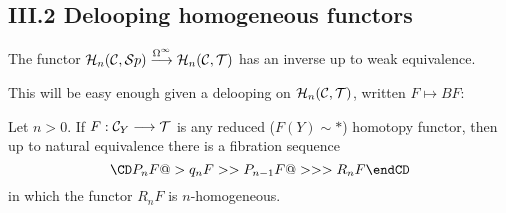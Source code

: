 \documentclass[11pt]{article}
\begin{document}
\begin{Calculus III}
\subsection*{III.2 Delooping homogeneous functors}
\begin{thm*}[\textbf{2.1}]
The functor
$
\mathcal{H}_n(\mathcal{C},\mathcal{S} p)\overset{\Omega^\infty}{\longrightarrow}\mathcal{H}_n(\mathcal{C},\mathcal{T})
$
has an inverse up to weak equivalence.
\end{thm*}
This will be easy enough given a delooping on $\mathcal{H}_n(\mathcal{C},\mathcal{T})$, written $F\mapsto BF$:
\begin{lem*}[\textbf{2.2}]
Let $n>0$. If $F:\mathcal{C}_Y\longrightarrow\mathcal{T}$ is
any reduced ($F(Y)\sim *$) homotopy functor, then up to natural equivalence
there is a fibration sequence
$$\CD
                            P_nF @>{q_nF}>> P_{n-1}F @>>> R_nF
\endCD
$$
in which the functor $R_nF$ is $n$-homogeneous.
\end{lem*}





\end{Calculus III}
\end{document}
